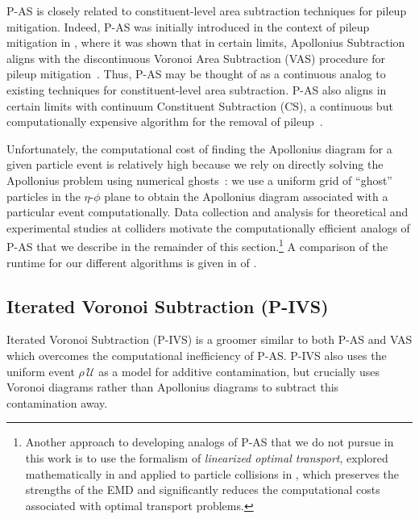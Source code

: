 \documentclass[letterpaper,11pt]{article}
\begin{document}
P-AS is closely related to constituent-level area subtraction techniques for pileup mitigation.
%
Indeed, P-AS was initially introduced in the context of pileup mitigation in , where it was shown that in certain limits, Apollonius Subtraction aligns with the discontinuous Voronoi Area Subtraction (VAS) procedure for pileup mitigation~\cite{Cacciari:2007fd, Cacciari:2008gn, Cacciari:2011ma}.
%
Thus, P-AS may be thought of as a continuous analog to existing techniques for constituent-level area subtraction.
%
P-AS also aligns in certain limits with continuum Constituent Subtraction (CS), a continuous but computationally expensive algorithm for the removal of pileup~\cite{Berta:2014eza, Komiske:2020qhg}.

Unfortunately, the computational cost of finding the Apollonius diagram for a given particle event is relatively high because we rely on directly solving the Apollonius problem using numerical ghosts~\cite{Komiske:2020qhg}:
%
we use a uniform grid of ``ghost'' particles in the \(\eta\)-\(\phi\) plane to obtain the Apollonius diagram associated with a particular event computationally.
%
Data collection and analysis for theoretical and experimental studies at colliders motivate the computationally efficient analogs of P-AS that we describe in the remainder of this section.\footnote{Another approach to developing analogs of P-AS that we do not pursue in this work is to use the formalism of \textit{linearized optimal transport}, explored mathematically in  and applied to particle collisions in , which preserves the strengths of the EMD and significantly reduces the computational costs associated with optimal transport problems.}
%
A comparison of the runtime for our different \PIRANHA{} algorithms is given in  of .

\subsection{Iterated Voronoi Subtraction (P-IVS)}
\label{sec:ivs}
Iterated Voronoi Subtraction (P-IVS) is a \PIRANHA{} groomer similar to both P-AS and VAS which overcomes the computational inefficiency of P-AS.
%
P-IVS also uses the uniform event \(\rho\,\mathcal U\) as a model for additive contamination, but crucially uses Voronoi diagrams rather than Apollonius diagrams to subtract this contamination away.
\end{document}
